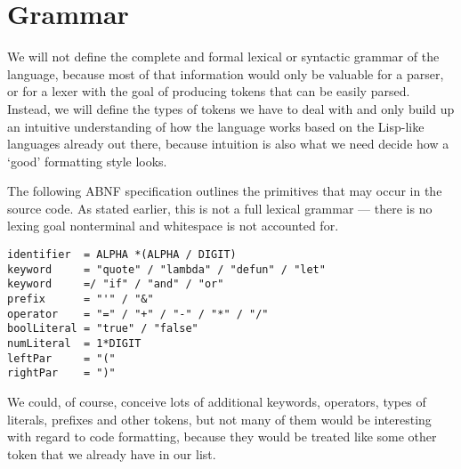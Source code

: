 \section{Grammar}
We will not define the complete and formal lexical or syntactic grammar of the language,
because most of that information would only be valuable for a parser,
or for a lexer with the goal of producing tokens that can be easily parsed.
Instead, we will define the types of tokens we have to deal with
and only build up an intuitive understanding of how the language works
based on the Lisp-like languages already out there,
because intuition is also what we need decide how a `good' formatting style looks.

The following ABNF specification outlines the primitives that may occur in the source code.
As stated earlier, this is not a full lexical grammar ---
there is no lexing goal nonterminal and whitespace is not accounted for.

\begin{verbatim}
identifier  = ALPHA *(ALPHA / DIGIT)
keyword     = "quote" / "lambda" / "defun" / "let"
keyword     =/ "if" / "and" / "or"
prefix      = "'" / "&"
operator    = "=" / "+" / "-" / "*" / "/"
boolLiteral = "true" / "false"
numLiteral  = 1*DIGIT
leftPar     = "("
rightPar    = ")"
\end{verbatim}

We could, of course, conceive lots of additional keywords, operators,
types of literals, prefixes and other tokens,
but not many of them would be interesting with regard to code formatting,
because they would be treated like some other token that we already have in our list.

